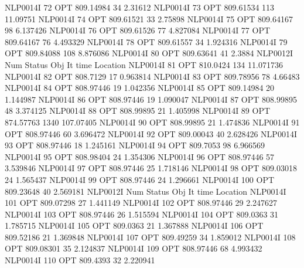 NLP0014I            72         OPT 809.14984       34 2.31612
NLP0014I            73         OPT 809.61534      113 11.09751
NLP0014I            74         OPT 809.61521       33 2.75898
NLP0014I            75         OPT 809.64167       98 6.137426
NLP0014I            76         OPT 809.61526       77 4.827084
NLP0014I            77         OPT 809.64167       76 4.493329
NLP0014I            78         OPT 809.61557       34 1.924316
NLP0014I            79         OPT 809.84088      108 8.876086
NLP0014I            80         OPT 809.63641       41 2.3884
NLP0012I 
              Num      Status      Obj             It       time                 Location
NLP0014I            81         OPT 810.0424      134 11.071736
NLP0014I            82         OPT 808.7129       17 0.963814
NLP0014I            83         OPT 809.78956       78 4.66483
NLP0014I            84         OPT 808.97446       19 1.042356
NLP0014I            85         OPT 809.14984       20 1.144987
NLP0014I            86         OPT 808.97446       19 1.090047
NLP0014I            87         OPT 808.99895       48 3.374125
NLP0014I            88         OPT 808.99895       21 1.405998
NLP0014I            89         OPT 874.57763     1340 107.07405
NLP0014I            90         OPT 808.99895       21 1.474836
NLP0014I            91         OPT 808.97446       60 3.696472
NLP0014I            92         OPT 809.00043       40 2.628426
NLP0014I            93         OPT 808.97446       18 1.245161
NLP0014I            94         OPT 809.7053       98 6.966569
NLP0014I            95         OPT 808.98404       24 1.354306
NLP0014I            96         OPT 808.97446       57 3.539846
NLP0014I            97         OPT 808.97446       25 1.718146
NLP0014I            98         OPT 809.03018       24 1.565437
NLP0014I            99         OPT 808.97446       24 1.296661
NLP0014I           100         OPT 809.23648       40 2.569181
NLP0012I 
              Num      Status      Obj             It       time                 Location
NLP0014I           101         OPT 809.07298       27 1.441149
NLP0014I           102         OPT 808.97446       29 2.247627
NLP0014I           103         OPT 808.97446       26 1.515594
NLP0014I           104         OPT 809.0363       31 1.785715
NLP0014I           105         OPT 809.0363       21 1.367888
NLP0014I           106         OPT 809.52186       21 1.369848
NLP0014I           107         OPT 809.49259       34 1.859012
NLP0014I           108         OPT 809.08301       35 2.124837
NLP0014I           109         OPT 808.97446       68 4.993432
NLP0014I           110         OPT 809.4393       32 2.220941
